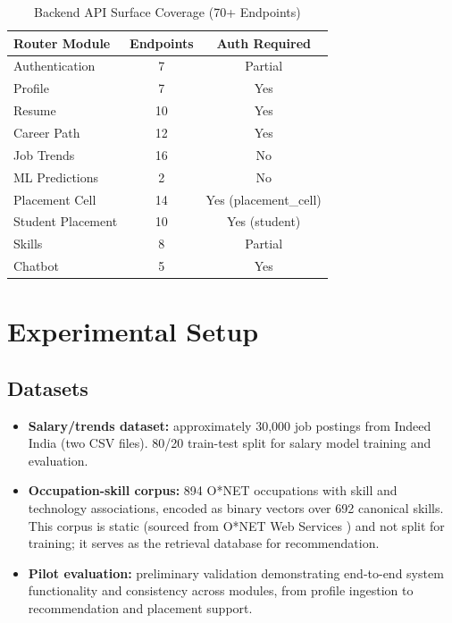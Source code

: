 \documentclass[conference]{IEEEtran}
\begin{document}
\begin{table}[htbp]
\caption{Backend API Surface Coverage (70+ Endpoints)}
\label{tab:api_coverage}
\centering
\begin{tabular}{lcc}
\toprule
Router Module & Endpoints & Auth Required \\
\midrule
Authentication     & 7  & Partial \\
Profile            & 7  & Yes \\
Resume             & 10 & Yes \\
Career Path        & 12 & Yes \\
Job Trends         & 16 & No \\
ML Predictions     & 2  & No \\
Placement Cell     & 14 & Yes (placement\_cell) \\
Student Placement  & 10 & Yes (student) \\
Skills             & 8  & Partial \\
Chatbot            & 5  & Yes \\
\bottomrule
\end{tabular}
\end{table}

\section{Experimental Setup}

\subsection{Datasets}
\begin{itemize}
\item \textbf{Salary/trends dataset:} approximately 30,000 job postings
      from Indeed India (two CSV files). 80/20 train-test split for
      salary model training and evaluation.
\item \textbf{Occupation-skill corpus:} 894 O*NET occupations with
      skill and technology associations, encoded as binary vectors over
      692 canonical skills. This corpus is static (sourced from O*NET
      Web Services \cite{onet}) and not split for training; it serves
      as the retrieval database for recommendation.
\item \textbf{Pilot evaluation:} preliminary validation demonstrating
      end-to-end system functionality and consistency across modules,
      from profile ingestion to recommendation and placement support.
\end{itemize}
\end{document}
